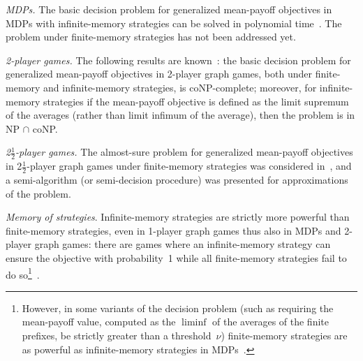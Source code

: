 \documentclass{article}
\newcommand{\half}{$\frac{\text{1}}{\text{2}}$}
\begin{document}
\begin{compactenum}
\item {\em MDPs.} The basic decision problem for generalized mean-payoff objectives in MDPs 
with infinite-memory strategies can be solved in polynomial time~\cite{BBCFK14}. 
The problem under finite-memory strategies has not been addressed yet.

\item {\em 2-player games.} 
The following results are known~\cite{VCDHRR15}:
the basic decision problem for generalized mean-payoff objectives in 
2-player graph games, both under finite-memory and infinite-memory 
strategies, is coNP-complete;
moreover, for infinite-memory strategies if the mean-payoff objective
is defined as the limit supremum of the averages (rather than limit infimum of 
the average), then the problem is in NP $\cap$ coNP.

\item {\em 2\half-player games.} 
The almost-sure problem for generalized mean-payoff objectives in 2\half-player 
graph games under finite-memory strategies was considered in~\cite{BKTW15}, and 
a semi-algorithm (or semi-decision procedure) was presented for approximations
of the problem.

\item {\em Memory of strategies}. Infinite-memory strategies are strictly more powerful than finite-memory 
strategies, even in 1-player graph games thus also in MDPs and 2-player graph games:
there are games where an infinite-memory strategy can ensure the objective with probability~1 
while all finite-memory strategies fail to do so\footnote{However, in some variants of the decision problem 
(such as requiring the mean-payoff value, computed as the $\liminf$ of the averages of the finite prefixes, 
be strictly greater than a threshold~$\nu$) finite-memory strategies are as powerful as
infinite-memory strategies in MDPs~\cite{CR15}. }~\cite{VCDHRR15}.
\end{compactenum}
\end{document}

